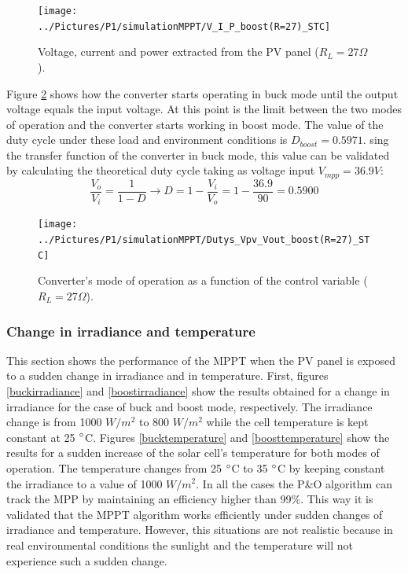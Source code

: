 \begin{figure}[H]
	\begin{center}
		\texttt{[image: ../Pictures/P1/simulationMPPT/V\_I\_P\_boost(R=27)\_STC]}
		\caption{Voltage, current and power extracted from the PV panel ($R_{L}=27\Omega$).}
		\label{boostSTC} 
	\end{center}	
\end{figure}

Figure \ref{boostSTC_duty} shows how the converter starts operating in buck mode until the output voltage equals the input voltage. At this point is the limit between the two modes of operation and the converter starts working in boost mode. The value of the duty cycle under these load and environment conditions is $D_{boost}= 0.5971$. sing the transfer function of the converter in  buck mode, this value can be validated by calculating the theoretical duty cycle taking as voltage input $V_{mpp}=36.9 V$: 
\begin{equation}
\frac{V_o}{V_i}= \frac{1}{1-D} \rightarrow D = 1 - \frac{V_i}{V_o} = 1 - \frac{36.9}{90} = 0.5900
\end{equation}
 
\begin{figure}[H]
	\begin{center}
		\texttt{[image: ../Pictures/P1/simulationMPPT/Dutys\_Vpv\_Vout\_boost(R=27)\_STC]}
		\caption{Converter's mode of operation as a function of the control variable ($R_{L}=27\Omega$).}
		\label{boostSTC_duty} 
	\end{center}	
\end{figure}

\subsubsection*{Change in irradiance and temperature}

This section shows the performance of the MPPT when the PV panel is exposed to a sudden change in irradiance and in temperature. First, figures \ref{buckirradiance} and \ref{boostirradiance} show the results obtained for a change in irradiance for the case of buck and boost mode, respectively. The irradiance change is from 1000 $W/ m^2$ to 800 $W/ m^2$ while the cell temperature is kept constant at 25 $\dec$C. 
Figures \ref{bucktemperature} and \ref{boosttemperature}  show the results for a sudden increase of the solar cell's temperature for both modes of operation. The temperature changes from 25 $\dec$C to 35 $\dec$C by keeping constant the irradiance to a value of 1000 $W/ m^2$. 
In all the cases the P\&O algorithm can track the MPP by maintaining an efficiency higher than 99\%. This way it is validated that the MPPT algorithm works efficiently under sudden changes of irradiance and temperature. However, this situations are not realistic because in real environmental conditions the sunlight and the temperature will not experience such a sudden change. 

